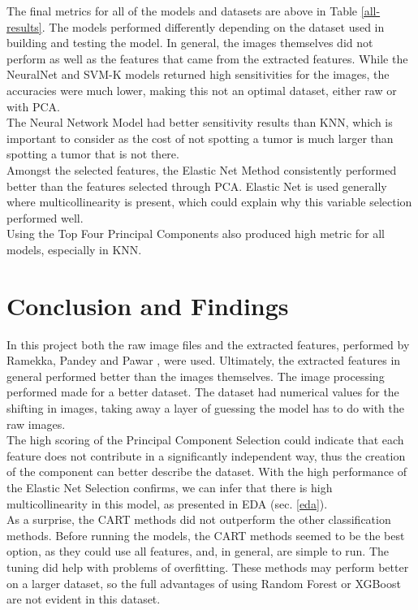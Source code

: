 \documentclass{article}
\begin{document}
The final metrics for all of the models and datasets are above in Table \ref{all-results}. The models performed differently depending on the dataset used in building and testing the model. In general, the images themselves did not perform as well as the features that came from the extracted features. While the NeuralNet  and SVM-K models returned high sensitivities for the images, the accuracies were much lower, making this not an optimal dataset, either raw or with PCA.\\

The Neural Network Model had better sensitivity results than KNN, which is important to consider as the cost of not spotting a tumor is much larger than spotting a tumor that is not there.\\ 

Amongst the selected features, the Elastic Net Method consistently performed better than the features selected through PCA. Elastic Net is used generally where multicollinearity is present, which could explain why this variable selection performed well.\\

Using the Top Four Principal Components also produced high metric for all models, especially in KNN.\\

\section{Conclusion and Findings}

In this project both the raw image files and the extracted features, performed by Ramekka, Pandey and Pawar \cite{accurate-detection}, were used. Ultimately, the extracted features in general performed better than the images themselves. The image processing performed made for a better dataset. The dataset had numerical values for the shifting in images, taking away a layer of guessing the model has to do with the raw images.\\

The high scoring of the Principal Component Selection could indicate that each feature does not contribute in a significantly independent way, thus the creation of the component can better describe the dataset. With the high performance of the Elastic Net Selection confirms, we can infer that there is high multicollinearity in this model, as presented in EDA (sec. \ref{eda}).\\

As a surprise, the CART methods did not outperform the other classification methods. Before running the models, the CART methods seemed to be the best option, as they could use all features, and, in general, are simple to run. The tuning did help with problems of overfitting. These methods may perform better on a larger dataset, so the full advantages of using Random Forest or XGBoost are not evident in this dataset.\\
\end{document}
